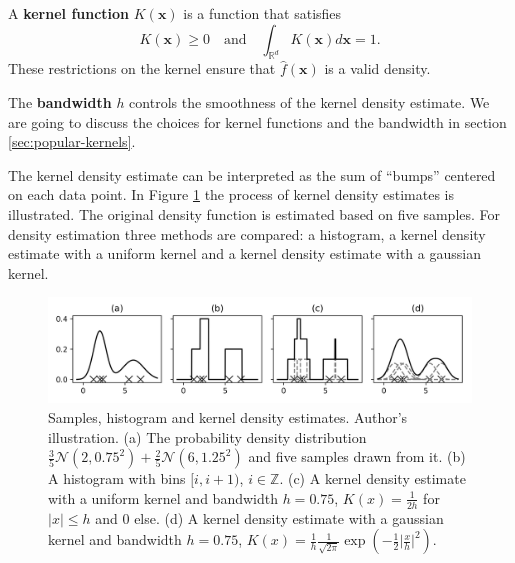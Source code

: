\documentclass{article}
\begin{document}
A \textbf{kernel function} $K(\bm{x})$ is a function that satisfies
\begin{equation}
	K(\bm{x}) \geq 0\quad \text{and}\quad \int_{\mathbb{R}^d} K(\bm{x}) d\bm{x} = 1\text{.}
\end{equation}
These restrictions on the kernel ensure that $\hat{f}(\bm{x})$ is a valid density.

The \textbf{bandwidth} $h$ controls the smoothness of the kernel density estimate. We are going to discuss the choices for kernel functions and the bandwidth in section \ref{sec:popular-kernels}.

The kernel density estimate can be interpreted as the sum of ``bumps'' centered on each data point. In Figure \ref{fig:kde-kernel-density-estimates} the process of kernel density estimates is illustrated. The original density function is estimated based on five samples. For density estimation three methods are compared: a histogram, a kernel density estimate with a uniform kernel and a kernel density estimate with a gaussian kernel.

\begin{figure}
	\includegraphics[width=\textwidth]{figures/kde-kernel-density-estimates}
	\caption[Samples, histogram and kernel density estimates]{Samples, histogram and kernel density estimates. Author's illustration.
		(a) The probability density distribution $\frac{3}{5} \mathcal{N}\left(2, 0.75^2\right) + \frac{2}{5} \mathcal{N}\left(6, 1.25^2\right)$ and five samples drawn from it.
		(b) A histogram with bins $[i,i+1)$, $i \in \mathbb{Z}$.
		(c) A kernel density estimate with a uniform kernel and bandwidth $h=0.75$, $K(x) = \frac{1}{2h}$ for $\lvert x \rvert \leq h$ and $0$ else.
		(d) A kernel density estimate with a gaussian kernel and bandwidth $h=0.75$, $K(x) = \frac{1}{h} \frac{1}{\sqrt{2\pi}} \exp(-\frac{1}{2} \lvert \frac{x}{h} \rvert^2)$.
	}
	\label{fig:kde-kernel-density-estimates}
\end{figure}


\end{document}

